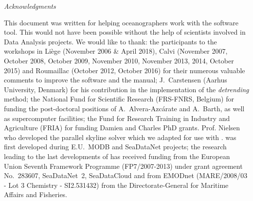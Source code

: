 
\vspace*{\fill}




{\it
\Large{Acknowledgments}
\vspace{1cm}
\parindent 1cm
\begin{center}
\begin{minipage}[c]{.85\textwidth}
\normalsize
This document was written for helping oceanographers work with the \diva software tool. This would not have been possible without the help of scientists involved in Data Analysis projects.
\newline
\newline
We would like to thank:
\newline
\newline
the participants to the \diva workshops in Li\`{e}ge (November 2006 \& April 2018), Calvi (November 2007, October 2008, October 2009, November 2010, November 2013, 2014, October 2015) and Roumaillac (October 2012, October 2016) for their numerous valuable comments to improve the software and the manual;
\newline
\newline
J.~Carstensen (Aarhus University, Denmark) for his contribution in the implementation of the \textit{detrending} method;
\newline
\newline 
the National Fund for Scientific Research (FRS-FNRS, Belgium) for funding the post-doctoral positions of A.~Alvera-Azc\'{a}rate and A.~Barth, as well as supercomputer facilities;
\newline
\newline
the Fund for Research Training in Industry and Agriculture (FRIA) for funding Damien and Charles PhD grants.
\newline
Prof. Nielsen who developed the parallel skyline solver which we adapted for use with \diva \citep{NIELSEN12}.
\newline
\newline
\diva was first developed during E.U.~MODB and SeaDataNet projects; the research leading to the last developments of \diva has received funding from the European Union Seventh Framework Programme (FP7/2007-2013) under grant agreement No.~283607, SeaDataNet~2, SeaDataCloud and from EMODnet (MARE/2008/03 - Lot 3 Chemistry - SI2.531432) from the Directorate-General for Maritime Affairs and Fisheries. 
\vspace{2cm}
\end{minipage}

\end{center}
}

\vspace*{\fill}

\newpage
